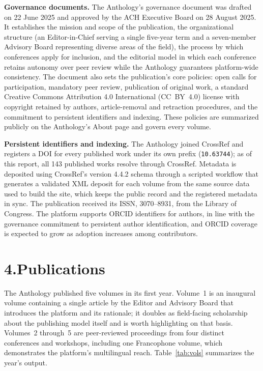 \documentclass[11pt]{article}
\begin{document}
\textbf{Governance documents.} The Anthology's governance document was drafted on 22 June 2025 and approved by the ACH Executive Board on 28 August 2025. It establishes the mission and scope of the publication, the organizational structure (an Editor-in-Chief serving a single five-year term and a seven-member Advisory Board representing diverse areas of the field), the process by which conferences apply for inclusion, and the editorial model in which each conference retains autonomy over peer review while the Anthology guarantees platform-wide consistency. The document also sets the publication's core policies: open calls for participation, mandatory peer review, publication of original work, a standard Creative Commons Attribution 4.0 International (CC~BY~4.0) license with copyright retained by authors, article-removal and retraction procedures, and the commitment to persistent identifiers and indexing. These policies are summarized publicly on the Anthology's About page and govern every volume.

\textbf{Persistent identifiers and indexing.} The Anthology joined CrossRef and registers a DOI for every published work under its own prefix (\texttt{10.63744}); as of this report, all 143 published works resolve through CrossRef. Metadata is deposited using CrossRef's version 4.4.2 schema through a scripted workflow that generates a validated XML deposit for each volume from the same source data used to build the site, which keeps the public record and the registered metadata in sync. The publication received its ISSN, 3070--8931, from the Library of Congress. The platform supports ORCID identifiers for authors, in line with the governance commitment to persistent author identification, and ORCID coverage is expected to grow as adoption increases among contributors.

\section*{4.\quad Publications}

The Anthology published five volumes in its first year. Volume~1 is an inaugural volume containing a single article by the Editor and Advisory Board that introduces the platform and its rationale; it doubles as field-facing scholarship about the publishing model itself and is worth highlighting on that basis. Volumes~2 through~5 are peer-reviewed proceedings from four distinct conferences and workshops, including one Francophone volume, which demonstrates the platform's multilingual reach. Table~\ref{tab:vols} summarizes the year's output.
\end{document}

